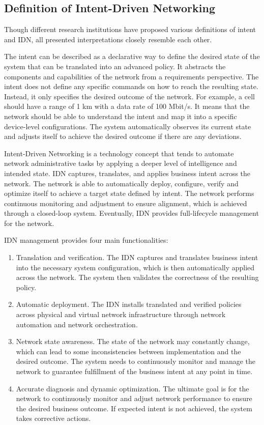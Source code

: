 \subsection{Definition of Intent-Driven Networking}
Though different research institutions have proposed various definitions of intent and IDN, all presented interpretations closely resemble each other. 

The intent can be described as a declarative way to define the desired state of the system that can be translated into an advanced policy. It abstracts the components and capabilities of the network from a requirements perspective. The intent does not define any specific commands on how to reach the resulting state. Instead, it only specifies the desired outcome of the network. For example, a cell should have a range of 1 km with a data rate of 100 Mbit/s.\cite{Mwanje2021} It means that the network should be able to understand the intent and map it into a specific device-level configurations.  The system automatically observes its current state and adjusts itself to achieve the desired outcome if there are any deviations. \cite[22867]{8968429}

Intent-Driven Networking is a technology concept that tends to automate network administrative tasks by applying a deeper level of intelligence and intended state. IDN captures, translates, and applies business intent across the network. The network is able to automatically deploy, configure, verify and optimize itself to achieve a target state defined by intent. The network performs continuous monitoring and adjustment to ensure alignment, which is achieved through a closed-loop system. Eventually, IDN provides full-lifecycle management for the network.\cite{8968429}

IDN management provides four main functionalities\cite[271]{Wei2020}: 

\begin{enumerate}
	\item Translation and verification. The IDN captures and translates business intent into the necessary system configuration, which is then automatically applied across the network. The system then validates the correctness of the resulting policy.
	\item Automatic deployment. The IDN installs translated and verified policies across physical and virtual network infrastructure through network automation and network orchestration.
	\item Network state awareness. The state of the network may constantly change, which can lead to some inconsistencies between implementation and the desired outcome. The system needs to continuously monitor and manage the network to guarantee fulfillment of the business intent at any point in time.
	\item Accurate diagnosis and dynamic optimization. The ultimate goal is for the network to continuously monitor and adjust network performance to ensure the desired business outcome. If expected intent is not achieved, the system takes corrective actions.
\end{enumerate}


